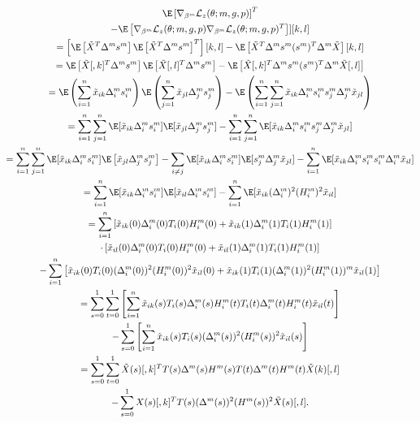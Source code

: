 \documentclass[12pt]{article}
\begin{document}
\begin{multline*}
[ \E \left[ \nabla_{\beta^m} \mathcal{L}_z(\theta; m, g, p) \right] \E \left[ \nabla_{\beta^m} \mathcal{L}_z(\theta; m, g, p) \right]^T \\ - \E \left[ \nabla_{\beta^m} \mathcal{L}_z(\theta; m, g, p) \nabla_{\beta^m} \mathcal{L}_z(\theta; m, g, p)^T \right] ][k,l] \\ 
= \left[ \E \left[\tilde{X}^T \Delta^m s^m \right] \E \left[\tilde{X}^T \Delta^m s^m \right]^T\right][k,l] - \E \left[\tilde{X}^T \Delta^m s^m (s^m)^T \Delta^m \tilde{X} \right][k,l] \\
= \E\left[ \tilde{X}[,k]^T \Delta^m s^m \right] \E \left[ \tilde{X}[,l]^T \Delta^m s^m \right] - \E \left[ \tilde{X}[,k]^T \Delta^m s^m (s^m)^T \Delta^m \tilde{X}[,l ] \right] \\ 
=\E\left(\sum_{i=1}^n \tilde{x}_{ik} \Delta^m_i s^m_{i} \right) \E \left( \sum_{j=1}^n \tilde{x}_{jl} \Delta^m_j s^m_j \right) - \E \left( \sum_{i=1}^n \sum_{j=1}^n \tilde{x}_{ik} \Delta^m_i s^m_i s^m_j \Delta^m_j \tilde{x}_{jl} \right) \\ 
= \sum_{i=1}^n \sum_{j=1}^n \E[ \tilde{x}_{ik} \Delta^m_is^m_i] \E [\tilde{x}_{jl} \Delta^m_j s^m_j]  -  \sum_{i=1}^n \sum_{j=1}^n \E [ \tilde{x}_{ik} \Delta^m_i s^m_i s^m_j \Delta^m_j \tilde{x}_{jl}] \\
= \sum_{i=1}^n \sum_{j=1}^n \E[ \tilde{x}_{ik} \Delta^m_i s^m_i] \E \left[\tilde{x}_{jl} \Delta^m_j s^m_j \right]  - \sum_{i \neq j} \E [ \tilde{x}_{ik} \Delta^m_i s^m_i] \E[s^m_j \Delta^m_j \tilde{x}_{jl}] - \sum_{i=1}^n \E[\tilde{x}_{ik} \Delta^m_i s^m_i s^m_i \Delta^m_i \tilde{x}_{il}] \\ 
= \sum_{i=1}^n \E[\tilde{x}_{ik} \Delta^m_i s^m_i ] \E [ \tilde{x}_{il} \Delta^m_i s^m_i] - \sum_{i=1}^n \E[\tilde{x}_{ik} (\Delta_i^m)^2 (H_i^m)^2 \tilde{x}_{il}] \\ = \sum_{i=1}^n \left[\tilde{x}_{ik}(0) {\Delta}^m_i(0) T_i(0) {H}^m_i(0) + \tilde{x}_{ik}(1) {\Delta}^m_i(1) T_i(1) {H}^m_i(1) \right] \\ \cdot \left[ \tilde{x}_{il}(0) {\Delta}^m_i(0) T_i(0) {H}^m_i(0) + \tilde{x}_{il}(1) {\Delta}^m_i(1) T_i(1) {H}^m_i(1) \right] \\ - \sum_{i=1}^n \left[ \tilde{x}_{ik}(0) T_i(0) (\Delta_i^m(0))^2 ({H}_i^m(0))^2 \tilde{x}_{il}(0)  + \tilde{x}_{ik}(1) T_i(1) ({\Delta}^m_i(1))^2 ({H}_i^m(1))^m \tilde{x}_{il}(1) \right] \\ = \sum_{s=0}^1 \sum_{t=0}^1 \left[ \sum_{i=1}^n \tilde{x}_{ik}(s) T_i(s) {\Delta}^m_i(s) {H}^m_i(t) T_i(t){\Delta}^m_i(t) {H}^m_i(t) \tilde{x}_{il}(t) \right] \\ - \sum_{s=0}^1 \left[\sum_{i=1}^n \tilde{x}_{ik}(s) T_i(s) ({\Delta}^m_i(s))^2 ({H}_i^m(s))^2 \tilde{x}_{il}(s) \right] \\ = \sum_{s=0}^1 \sum_{t=0}^1 \tilde{X}(s)[,k]^T {T}(s) {\Delta}^m(s) {H}^m(s) {T}(t) {\Delta}^m(t) {H}^m(t) \tilde{X}(k)[,l] \\ - \sum_{s=0}^1{X}(s)[,k]^T {T}(s) ({\Delta}^m(s))^2 ({H}^m(s))^2 \tilde{X}(s)[,l].
\end{multline*}
\end{document}
